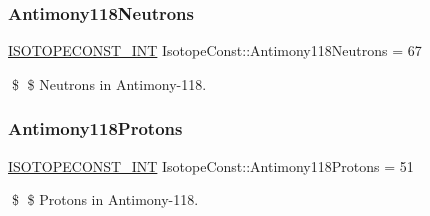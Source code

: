 \subsubsection{\texorpdfstring{Antimony118\+Neutrons}{Antimony118Neutrons}}
{\footnotesize\ttfamily \mbox{\hyperlink{group___isotope_const-_macros_ga5f18360b3e99483a35c32d789e62621c}{I\+S\+O\+T\+O\+P\+E\+C\+O\+N\+S\+T\+\_\+\+I\+NT}} Isotope\+Const\+::\+Antimony118\+Neutrons = 67}

\$ \$ Neutrons in Antimony-\/118. \mbox{\label{group___isotope_const-_antimony-_sb118_gac2e57822b7e37ffd384552a788d5b4aa}} 
\subsubsection{\texorpdfstring{Antimony118\+Protons}{Antimony118Protons}}
{\footnotesize\ttfamily \mbox{\hyperlink{group___isotope_const-_macros_ga5f18360b3e99483a35c32d789e62621c}{I\+S\+O\+T\+O\+P\+E\+C\+O\+N\+S\+T\+\_\+\+I\+NT}} Isotope\+Const\+::\+Antimony118\+Protons = 51}

\$ \$ Protons in Antimony-\/118. 